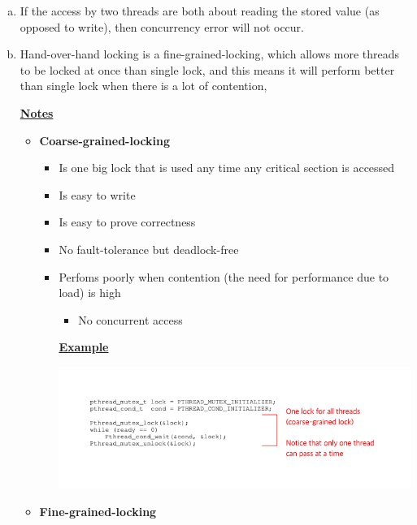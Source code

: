 \documentclass[12pt]{article}
\begin{document}
\begin{enumerate}[1.]
\begin{enumerate}[a)]
        \item

        If the access by two threads are both about reading the stored value (as opposed to write),
        then concurrency error will not occur.

        \item

        Hand-over-hand locking is a fine-grained-locking, which allows more threads
        to be locked at once than single lock, and this means it will perform better
        than single lock when there is a lot of contention,

        \bigskip

        \underline{\textbf{Notes}}

        \begin{itemize}
            \item \textbf{Coarse-grained-locking}

            \begin{itemize}
                \item Is one big lock that is used any time any critical section is accessed
                \item Is easy to write
                \item Is easy to prove correctness
                \item No fault-tolerance but deadlock-free
                \item Perfoms poorly when contention (the need for performance due to load) is high
                \begin{itemize}
                    \item No concurrent access
                \end{itemize}

                \bigskip

                \underline{\textbf{Example}}

                \bigskip

                \begin{center}
                \includegraphics[width=\linewidth]{../images/midterm_3_solution_10.png}
                \end{center}
            \end{itemize}
            \item \textbf{Fine-grained-locking}


\end{itemize}
\end{enumerate}
\end{enumerate}
\end{document}
